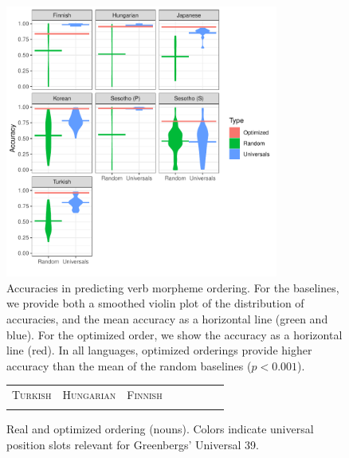 \documentclass[11pt,letterpaper]{article}
\begin{document}
\begin{figure}[]
    \centering
\includegraphics[width=0.8\textwidth]{figures/accuracies_verbs.pdf}
    \caption{Accuracies in predicting verb morpheme ordering.
    For the baselines, we provide both a smoothed violin plot of the distribution of accuracies, and the mean accuracy as a horizontal line (green and blue). For the optimized order, we show the accuracy as a horizontal line (red).
    In all languages, optimized orderings provide higher accuracy than the mean of the random baselines ($p<0.001$).}
    \label{tab:optimized_acc_verbs}
\end{figure}


\begin{figure}[]
\begin{tabular}{cccccccc}
\textsc{Turkish} & \textsc{Hungarian} & \textsc{Finnish} \\
\begin{minipage}{.3\textwidth}
  
    \end{minipage}
  &
  \begin{minipage}{.3\textwidth}
  
    \end{minipage}
  &
  \begin{minipage}{.3\textwidth}
  
  \end{minipage}
  \end{tabular}
  
    \caption{Real and optimized ordering (nouns). Colors indicate universal position slots relevant for Greenbergs' Universal 39.}
    \label{fig:real_and_optimized_nouns}
\end{figure}
\end{document}
